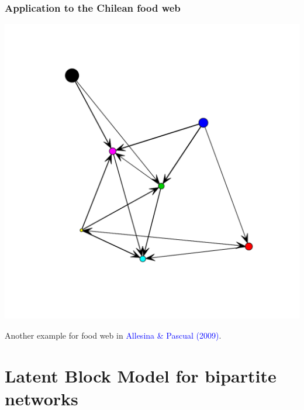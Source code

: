 \documentclass[nopagenumber,9pt]{beamer}
\begin{document}
\begin{frame}
 \frametitle{Application to the Chilean food web}
 
 \begin{center}
  \includegraphics[scale=.3]{plots/chilean_sbm_sum.pdf}
 \end{center}

 
 Another example for food web in \textcolor{blue}{Allesina \& Pascual (2009)}.
\end{frame}





\section{Latent Block Model for bipartite networks}
\end{document}
